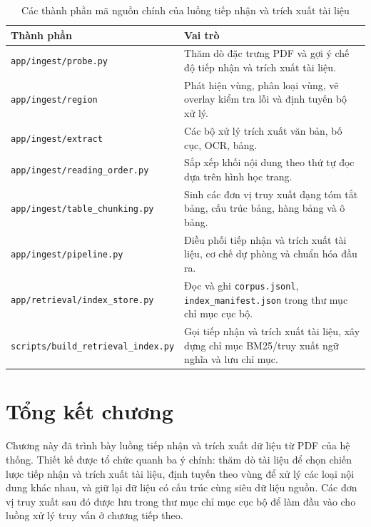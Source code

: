 \documentclass[../DoAn.tex]{subfiles}
\begin{document}
\begin{table}[H]
\centering
\small
\renewcommand{\arraystretch}{1.2}
\caption{Các thành phần mã nguồn chính của luồng tiếp nhận và trích xuất tài liệu}
\label{tab:ingest-code-organization}
\begin{tabularx}{\textwidth}{
    |>{\raggedright\arraybackslash}p{}
    |>{\raggedright\arraybackslash}X|
}
\hline
\textbf{Thành phần} & \textbf{Vai trò} \\
\hline
\texttt{app/ingest/probe.py} &
Thăm dò đặc trưng PDF và gợi ý chế độ tiếp nhận và trích xuất tài liệu. \\
\hline
\texttt{app/ingest/region} &
Phát hiện vùng, phân loại vùng, vẽ overlay kiểm tra lỗi và định tuyến bộ xử lý. \\
\hline
\texttt{app/ingest/extract} &
Các bộ xử lý trích xuất văn bản, bố cục, OCR, bảng. \\
\hline
\texttt{app/ingest/reading\_order.py} &
Sắp xếp khối nội dung theo thứ tự đọc dựa trên hình học trang. \\
\hline
\texttt{app/ingest/table\_chunking.py} &
Sinh các đơn vị truy xuất dạng tóm tắt bảng, cấu trúc bảng, hàng bảng và ô bảng. \\
\hline
\texttt{app/ingest/pipeline.py} &
Điều phối tiếp nhận và trích xuất tài liệu, cơ chế dự phòng và chuẩn hóa đầu ra. \\
\hline
\texttt{app/retrieval/index\_store.py} &
Đọc và ghi \texttt{corpus.jsonl}, \texttt{index\_manifest.json} trong thư mục chỉ mục cục bộ. \\
\hline
\texttt{scripts/build\_retrieval\_index.py} &
Gọi tiếp nhận và trích xuất tài liệu, xây dựng chỉ mục BM25/truy xuất ngữ nghĩa và lưu chỉ mục. \\
\hline
\end{tabularx}
\end{table}

\section{Tổng kết chương}
\label{section:chapter4-ingest-summary}

Chương này đã trình bày luồng tiếp nhận và trích xuất dữ liệu từ PDF của hệ thống. Thiết kế
được tổ chức quanh ba ý chính: thăm dò tài liệu để chọn chiến lược tiếp nhận và trích xuất tài liệu, định
tuyến theo vùng để xử lý các loại nội dung khác nhau, và giữ lại dữ liệu có cấu
trúc cùng siêu dữ liệu nguồn. Các đơn vị truy xuất sau đó được lưu trong thư mục
chỉ mục cục bộ để làm đầu vào cho luồng xử lý truy vấn ở chương tiếp theo.
\end{document}
